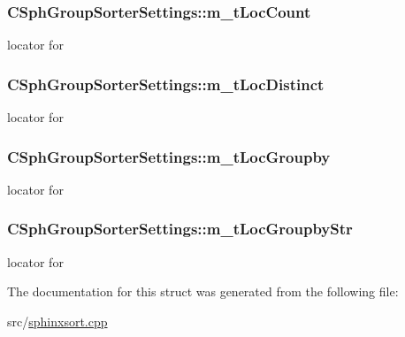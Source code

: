 \hypertarget{structCSphGroupSorterSettings_a3b7a40d09116a62563a26b90dad2715a}{
\subsubsection[{m\-\_\-t\-Loc\-Count}]{ C\-Sph\-Group\-Sorter\-Settings\-::m\-\_\-t\-Loc\-Count}}\label{structCSphGroupSorterSettings_a3b7a40d09116a62563a26b90dad2715a}


locator for  

\hypertarget{structCSphGroupSorterSettings_a34ecf99b7f404aab7476e459dea8df6d}{
\subsubsection[{m\-\_\-t\-Loc\-Distinct}]{ C\-Sph\-Group\-Sorter\-Settings\-::m\-\_\-t\-Loc\-Distinct}}\label{structCSphGroupSorterSettings_a34ecf99b7f404aab7476e459dea8df6d}


locator for  

\hypertarget{structCSphGroupSorterSettings_a0afffef6aac99d41a348961881960162}{
\subsubsection[{m\-\_\-t\-Loc\-Groupby}]{ C\-Sph\-Group\-Sorter\-Settings\-::m\-\_\-t\-Loc\-Groupby}}\label{structCSphGroupSorterSettings_a0afffef6aac99d41a348961881960162}


locator for  

\hypertarget{structCSphGroupSorterSettings_af5b5313a9a0042996f5d9723d0559189}{
\subsubsection[{m\-\_\-t\-Loc\-Groupby\-Str}]{ C\-Sph\-Group\-Sorter\-Settings\-::m\-\_\-t\-Loc\-Groupby\-Str}}\label{structCSphGroupSorterSettings_af5b5313a9a0042996f5d9723d0559189}


locator for  



The documentation for this struct was generated from the following file\-:\begin{DoxyCompactItemize}
\item 
src/\hyperlink{sphinxsort_8cpp}{sphinxsort.\-cpp}\end{DoxyCompactItemize}
